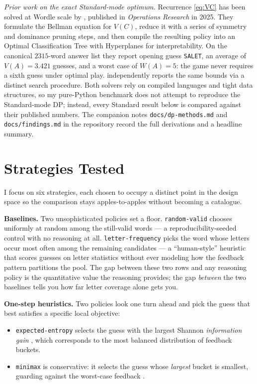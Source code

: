\documentclass[11pt]{article}
\begin{document}
\textit{Prior work on the exact Standard-mode optimum.} Recurrence
\eqref{eq:VC} has been solved at Wordle scale by
\citet{bertsimas2022wordle}, published in \emph{Operations Research}
in 2025. They formulate the Bellman equation for $V(C)$, reduce it
with a series of symmetry and dominance pruning steps, and then
compile the resulting policy into an Optimal Classification Tree with
Hyperplanes for interpretability. On the canonical $\num{2315}$-word
answer list they report opening guess \texttt{SALET}, an average of
$V(A) = 3.421$ guesses, and a worst case of $W(A) = 5$: the game
never requires a sixth guess under optimal play.
\citet{selby2022wordle} independently reports the same bounds via a
distinct search procedure. Both solvers rely on compiled languages
and tight data structures, so my pure-Python benchmark does not
attempt to reproduce the Standard-mode DP; instead, every Standard
result below is compared against their published numbers. The
companion notes \texttt{docs/dp-methods.md} and
\texttt{docs/findings.md} in the repository record the full
derivations and a headline summary.

\section*{Strategies Tested}

I focus on six strategies, each chosen to occupy a distinct point in
the design space so the comparison stays apples-to-apples without
becoming a catalogue.

\textbf{Baselines.} Two unsophisticated policies set a floor.
\texttt{random-valid} chooses uniformly at random among the
still-valid words --- a reproducibility-seeded control with no
reasoning at all. \texttt{letter-frequency} picks the word whose
letters occur most often among the remaining candidates --- a
``human-style'' heuristic that scores guesses on letter statistics
without ever modeling how the feedback pattern partitions the pool.
The gap between these two rows and any reasoning policy is the
quantitative value the reasoning provides; the gap \emph{between}
the two baselines tells you how far letter coverage alone gets you.

\textbf{One-step heuristics.} Two policies look one turn ahead and
pick the guess that best satisfies a specific local objective:

\begin{itemize}
\item \texttt{expected-entropy} selects the guess with the largest
Shannon \emph{information gain} \citep{shannon1948,sanderson2022wordle},
which corresponds to the most balanced distribution of feedback
buckets.
\item \texttt{minimax} is conservative: it selects the guess whose
\emph{largest} bucket is smallest, guarding against the worst-case
feedback \citep{selby2022wordle}.
\end{itemize}
\end{document}
